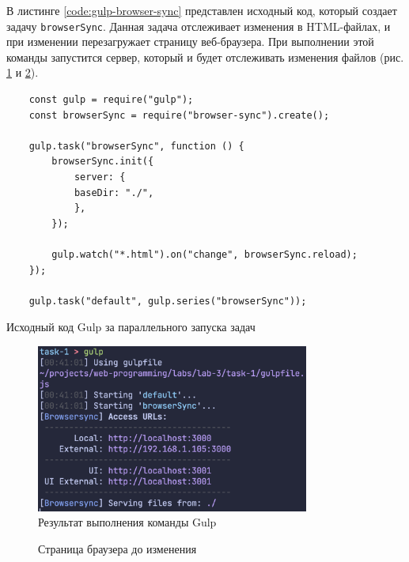 \documentclass[a4paper, 14pt]{extarticle}
\newenvironment{code}{\captionsetup{type=listing}}{}
\begin{document}
В листинге \ref{code:gulp-browser-sync} представлен исходный код, который
создает задачу \texttt{browserSync}. Данная задача отслеживает изменения в
HTML-файлах, и при изменении перезагружает страницу веб-браузера. При выполнении
этой команды запустится сервер, который и будет отслеживать изменения файлов
(рис. \ref{fig:gulp-browser-sync} и \ref{fig:browser-before}).

\begin{code}
  \begin{verbatim}
    const gulp = require("gulp");
    const browserSync = require("browser-sync").create();

    gulp.task("browserSync", function () {
        browserSync.init({
            server: {
            baseDir: "./",
            },
        });

        gulp.watch("*.html").on("change", browserSync.reload);
    });

    gulp.task("default", gulp.series("browserSync"));
  \end{verbatim}
  \caption{Исходный код Gulp за параллельного запуска задач}
  \label{code:gulp-browser-sync}
\end{code}

\begin{figure}[H]
  \centering
  \includegraphics[width=0.8\textwidth]{images/gulp-browser-sync.png}
  \caption{Результат выполнения команды Gulp}
  \label{fig:gulp-browser-sync}
\end{figure}

\begin{figure}[H]
  \centering
  \caption{Страница браузера до изменения}
  \label{fig:browser-before}
\end{figure}
\end{document}
